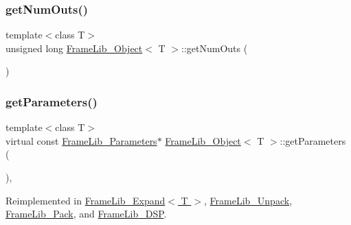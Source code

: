 \mbox{\label{class_frame_lib___object_a6be2c4c3faf10ce732347b2e59f51508}} 
\subsubsection{\texorpdfstring{get\+Num\+Outs()}{getNumOuts()}}
{\footnotesize\ttfamily template$<$class T$>$ \\
unsigned long \hyperlink{class_frame_lib___object}{Frame\+Lib\+\_\+\+Object}$<$ T $>$\+::get\+Num\+Outs (\begin{DoxyParamCaption}{ }\end{DoxyParamCaption})\hspace{0.3cm}{\ttfamily [inline]}}

\mbox{\label{class_frame_lib___object_aaebb53211e0617e9203d1088c2fcb9c2}} 
\subsubsection{\texorpdfstring{get\+Parameters()}{getParameters()}}
{\footnotesize\ttfamily template$<$class T$>$ \\
virtual const \hyperlink{class_frame_lib___parameters}{Frame\+Lib\+\_\+\+Parameters}$\ast$ \hyperlink{class_frame_lib___object}{Frame\+Lib\+\_\+\+Object}$<$ T $>$\+::get\+Parameters (\begin{DoxyParamCaption}{ }\end{DoxyParamCaption})\hspace{0.3cm}{\ttfamily [inline]}, {\ttfamily [virtual]}}



Reimplemented in \hyperlink{class_frame_lib___expand_a89b4ff711b3b2772ee3ac7a6774261fb}{Frame\+Lib\+\_\+\+Expand$<$ T $>$}, \hyperlink{class_frame_lib___unpack_aa9da91c13a8e4d648bdef0037973dc56}{Frame\+Lib\+\_\+\+Unpack}, \hyperlink{class_frame_lib___pack_a878bce4df2ece362d86cd03f742bc646}{Frame\+Lib\+\_\+\+Pack}, and \hyperlink{class_frame_lib___d_s_p_ac871e4980da27cbd5238b8780a357217}{Frame\+Lib\+\_\+\+D\+SP}.

